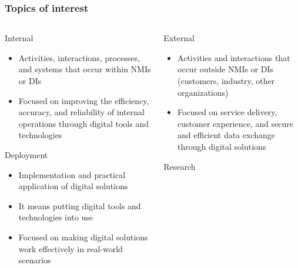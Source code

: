 \documentclass{beamer}
\begin{document}
    \begin{frame}
        \frametitle{Topics of interest}
        \begin{columns}%
            \begin{column}{0.45\textwidth}
                \begin{block}{Internal}
                    \scriptsize
                    \begin{itemize}
                        \item Activities, interactions, processes, and systems that occur within NMIs or DIs
                        \item Focused on improving the efficiency, accuracy, and reliability of internal operations through digital tools and technologies
                    \end{itemize}
                \end{block}
                \begin{exampleblock}{Deployment}
                    \scriptsize
                    \begin{itemize}
                        \item Implementation and practical application of digital solutions
                        \item It means putting digital tools and technologies into use
                        \item Focused on making digital solutions work effectively in real-world scenarios
                    \end{itemize}
                \end{exampleblock}
            \end{column}
            \begin{column}{0.45\textwidth}
                \begin{block}{External}
                    \scriptsize
                    \begin{itemize}
                        \item Activities and interactions that occur outside NMIs or DIs
                        (customers, industry, other organizations)
                        \item Focused on service delivery, customer experience,
                        and secure and efficient data exchange through digital solutions
                    \end{itemize}
                \end{block}
                \begin{exampleblock}{Research}

\end{exampleblock}
\end{column}
\end{columns}
\end{frame}
\end{document}
